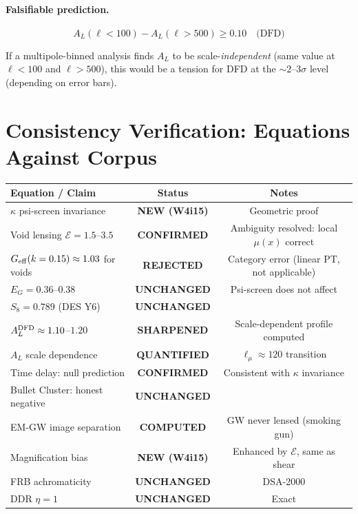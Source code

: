 \documentclass[11pt,a4paper]{article}
\newcommand{\Geff}{G_{\rm eff}}
\begin{document}
\paragraph{Falsifiable prediction.}
\begin{equation}
\boxed{
A_L(\ell < 100) - A_L(\ell > 500) \geq 0.10 \quad \text{(DFD)}
}
\end{equation}

If a multipole-binned analysis finds $A_L$ to be scale-\emph{independent}
(same value at $\ell < 100$ and $\ell > 500$), this would be a tension
for DFD at the $\sim 2$--$3\sigma$ level (depending on error bars).


\section{Consistency Verification: Equations Against Corpus}

\begin{center}
\begin{tabular}{lcc}
\toprule
Equation / Claim & Status & Notes \\
\midrule
$\kappa$ psi-screen invariance & \textbf{NEW (W4i15)} & Geometric proof \\
Void lensing $\mathcal{E} = 1.5$--$3.5$ & \textbf{CONFIRMED} &
  Ambiguity resolved: local $\mu(x)$ correct \\
$\Geff(k=0.15) \approx 1.03$ for voids & \textbf{REJECTED} &
  Category error (linear PT, not applicable) \\
$E_G = 0.36$--$0.38$ & \textbf{UNCHANGED} & Psi-screen does not affect \\
$S_8 = 0.789$ (DES Y6) & \textbf{UNCHANGED} & \\
$A_L^{\rm DFD} \approx 1.10$--$1.20$ & \textbf{SHARPENED} &
  Scale-dependent profile computed \\
$A_L$ scale dependence & \textbf{QUANTIFIED} &
  $\ell_\mu \approx 120$ transition \\
Time delay: null prediction & \textbf{CONFIRMED} &
  Consistent with $\kappa$ invariance \\
Bullet Cluster: honest negative & \textbf{UNCHANGED} & \\
EM-GW image separation & \textbf{COMPUTED} &
  GW never lensed (smoking gun) \\
Magnification bias & \textbf{NEW (W4i15)} &
  Enhanced by $\mathcal{E}$, same as shear \\
FRB achromaticity & \textbf{UNCHANGED} & DSA-2000 \\
DDR $\eta = 1$ & \textbf{UNCHANGED} & Exact \\
\bottomrule
\end{tabular}
\end{center}
\end{document}
